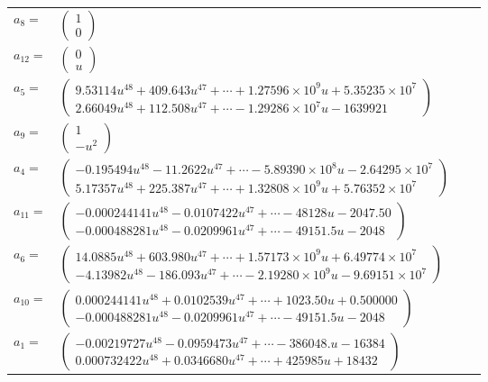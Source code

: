 \documentclass[1p]{elsarticle_modified}
\theoremstyle{definition}
\begin{document}
\begin{tabular}{m{7pt} m{180pt} m{7pt} m{180pt} }
\flushright $a_{8}=$&$\begin{pmatrix}1\\0\end{pmatrix}$ \\
\flushright $a_{12}=$&$\begin{pmatrix}0\\u\end{pmatrix}$ \\
\flushright $a_{5}=$&$\begin{pmatrix}9.53114 u^{48}+409.643 u^{47}+\cdots+1.27596\times10^{9} u+5.35235\times10^{7}\\2.66049 u^{48}+112.508 u^{47}+\cdots-1.29286\times10^{7} u-1639921\end{pmatrix}$ \\
\flushright $a_{9}=$&$\begin{pmatrix}1\\- u^2\end{pmatrix}$ \\
\flushright $a_{4}=$&$\begin{pmatrix}-0.195494 u^{48}-11.2622 u^{47}+\cdots-5.89390\times10^{8} u-2.64295\times10^{7}\\5.17357 u^{48}+225.387 u^{47}+\cdots+1.32808\times10^{9} u+5.76352\times10^{7}\end{pmatrix}$ \\
\flushright $a_{11}=$&$\begin{pmatrix}-0.000244141 u^{48}-0.0107422 u^{47}+\cdots-48128 u-2047.50\\-0.000488281 u^{48}-0.0209961 u^{47}+\cdots-49151.5 u-2048\end{pmatrix}$ \\
\flushright $a_{6}=$&$\begin{pmatrix}14.0885 u^{48}+603.980 u^{47}+\cdots+1.57173\times10^{9} u+6.49774\times10^{7}\\-4.13982 u^{48}-186.093 u^{47}+\cdots-2.19280\times10^{9} u-9.69151\times10^{7}\end{pmatrix}$ \\
\flushright $a_{10}=$&$\begin{pmatrix}0.000244141 u^{48}+0.0102539 u^{47}+\cdots+1023.50 u+0.500000\\-0.000488281 u^{48}-0.0209961 u^{47}+\cdots-49151.5 u-2048\end{pmatrix}$ \\
\flushright $a_{1}=$&$\begin{pmatrix}-0.00219727 u^{48}-0.0959473 u^{47}+\cdots-386048. u-16384\\0.000732422 u^{48}+0.0346680 u^{47}+\cdots+425985 u+18432\end{pmatrix}$ \\

\end{tabular}
\end{document}
